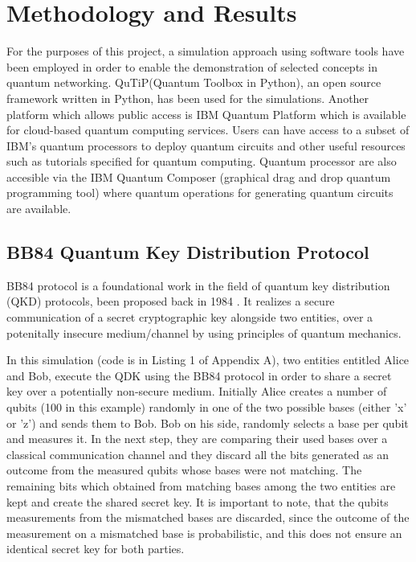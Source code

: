 \documentclass[12pt,a4paper] {report}
\begin{document}
	\chapter{Methodology and Results}
		
		For the purposes of this project, a
		simulation approach using software tools
		have been employed in order to enable the
		demonstration of selected concepts in quantum networking.
		QuTiP(Quantum Toolbox in Python)\cite{qutip}, an open source framework
		written in Python, has been used for the simulations.
		Another platform which allows public access is IBM Quantum Platform\cite{qiskit} which is available for cloud-based quantum computing services. 
		Users can have access to a subset of IBM's quantum processors to deploy quantum circuits 
		and other useful resources such as tutorials specified for quantum computing. Quantum processor are also accesible via the
		IBM Quantum Composer (graphical drag and drop quantum programming tool) where quantum operations for generating quantum circuits 
		are available.

		\section{BB84 Quantum Key Distribution Protocol}

		BB84 protocol is a foundational work in the field
		of quantum key distribution (QKD) protocols,
		been proposed back in 1984 \cite{bb84}.
		It realizes a secure communication of a secret cryptographic key
		alongside two entities, over a potenitally insecure medium/channel
		by using principles of quantum mechanics.
		
		In this simulation (code is in Listing 1 of Appendix A),
		two entities entitled Alice and Bob, execute the QDK using the BB84 protocol
		in order to share a secret key over a potentially non-secure medium. Initially Alice creates
		a number of qubits (100 in this example) randomly in one of the two possible bases (either 'x' or 'z') and sends them 
		to Bob. Bob on his side, randomly selects a base per qubit and measures it. In the next step, 
		they are comparing their used bases over a classical communication channel and 
		they discard all the bits generated as an outcome from the measured qubits whose bases were not matching.
		The remaining bits which obtained from matching bases among the two entities are kept and create the shared secret key.
		It is important to note, that the qubits measurements from the mismatched bases are 
		discarded, since the outcome of the measurement on a mismatched base is probabilistic,
		and this does not ensure an identical secret key for both parties.
\end{document}
